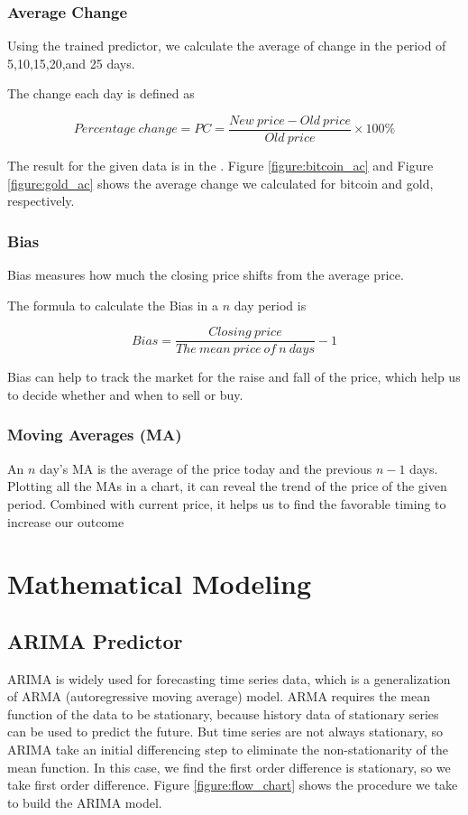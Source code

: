\documentclass[12pt,a4paper]{article}
\newcommand{\Predictor}{ARIMA }
\begin{document}
\begin{spacing}{1.2}
\subsubsection{Average Change}

Using the trained predictor, we calculate the average of change in the period of 5,10,15,20,and 25 days.

The change each day is defined as

$$
Percentage \ change = PC = \frac{New \ price-Old \ price}{Old \ price} \times 100\%
$$


The result for the given data is in the . Figure \ref{figure:bitcoin_ac} and Figure \ref{figure:gold_ac} shows the average change we calculated for bitcoin and gold, respectively.


\subsubsection{Bias}

Bias measures how much the closing price shifts from the average price.

The formula to calculate the Bias in a $n$ day period is

$$
Bias = \frac{Closing \ price}{The \ mean \ price \ of \ n \ days} - 1
$$

Bias can help to track the market for the raise and fall of the price, which help us to decide whether and when to sell or buy.

\subsubsection{Moving Averages (MA)}

An $n$ day's MA is the average of the price today and the previous $n-1$ days. Plotting all the MAs in a chart, it can reveal the trend of the price of the given period. Combined with current price, it helps us to find the favorable timing to increase our outcome

\section{Mathematical Modeling}
\label{MathModels}

\subsection{\Predictor Predictor}

\Predictor is widely used for forecasting time series data, which is a generalization of ARMA (autoregressive moving average) model. ARMA requires the mean function of the data to be stationary, because history data of stationary series can be used to predict the future. But time series are not always stationary, so ARIMA take an initial differencing step to eliminate the non-stationarity of the mean function. In this case, we find the first order difference is stationary, so we take first order difference. Figure \ref{figure:flow_chart} shows the procedure we take to build the \Predictor model.


\end{spacing}
\end{document}
